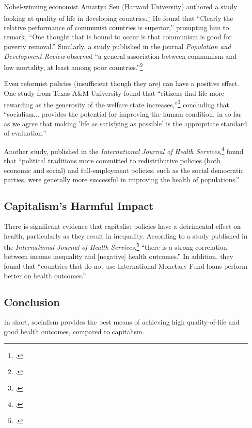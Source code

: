Nobel-winning economist Amartya Sen (Harvard University) authored a study looking at quality of life in developing countries.\footcite{sen-public}
He found that ``Clearly the relative performance of communist countries is superior,'' prompting him to remark, ``One thought that is bound to occur is that communism is good for poverty removal.''
Similarly, a study published in the journal \textit{Population and Development Review} observed ``a general association between communism and low mortality, at least among poor countries.''\footcite{bryant-population}

Even reformist policies (insufficient though they are) can have a positive effect.
One study from Texas A\&M University found that ``citizens find life more rewarding as the generosity of the welfare state increases,''\footcite{pacek-welfare} concluding that ``socialism... provides the potential for improving the human condition, in so far as we agree that making 'life as satisfying as possible' is the appropriate standard of evaluation.''

Another study, published in the \textit{International Journal of Health Services},\footcite{navarro-political} found that ``political traditions more committed to redistributive policies (both economic and social) and full-employment policies, such as the social democratic parties, were generally more successful in improving the health of populations.''

\subsection*{Capitalism's Harmful Impact}

There is significant evidence that capitalist policies have a detrimental effect on health, particularly as they result in inequality.
According to a study published in the \textit{International Journal of Health Services},\footcite{ferre-inequalities} ``there is a strong correlation between income inequality and [negative] health outcomes.''
In addition, they found that ``countries that do not use International Monetary Fund loans perform better on health outcomes.''

\subsection*{Conclusion}

In short, socialism provides the best means of achieving high quality-of-life and good health outcomes, compared to capitalism.
